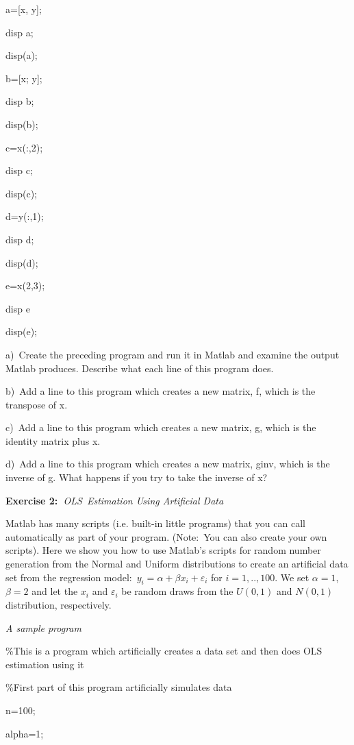 \documentclass{article}
\begin{document}
a=[x, y];

disp a;

disp(a);

b=[x; y];

disp b;

disp(b);

c=x(:,2);

disp c;

disp(c);

d=y(:,1);

disp d;

disp(d);

e=x(2,3);

disp e

disp(e);

\bigskip

a)\ Create the preceding program and run it in Matlab and examine the output
Matlab produces. Describe what each line of this program does.

b)\ Add a line to this program which creates a new matrix, f, which is the
transpose of x.

c)\ Add a line to this program which creates a new matrix, g, which is the
identity matrix plus x.

d)\ Add a line to this program which creates a new matrix, ginv, which is
the inverse of g. What happens if you try to take the inverse of x?

\bigskip

\textbf{Exercise 2:\ }\textit{OLS\ Estimation Using Artificial Data}

\qquad Matlab has many scripts (i.e. built-in little programs) that you can
call automatically as part of your program. (Note:\ You can also create your
own scripts). Here we show you how to use Matlab's scripts for random number
generation from the Normal and Uniform distributions to create an artificial
data set from the regression model:\ $y_{i}=\alpha +\beta x_{i}+\varepsilon
_{i}$ for $i=1,..,100$. We set $\alpha =1$, $\beta =2$ and let the $x_{i}$
and $\varepsilon _{i}$ be random draws from the $U\left( 0,1\right) $ and $%
N\left( 0,1\right) $ distribution, respectively.

\textit{A sample program}

\%This is a program which artificially creates a data set and then does OLS
estimation using it

\%First part of this program artificially simulates data

n=100;

alpha=1;
\end{document}
